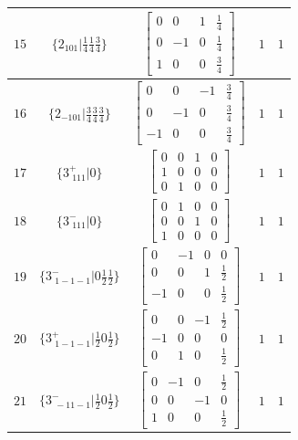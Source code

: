 \documentclass[fleqn,8pt]{jsarticle}
\begin{document}
\begin{longtable}{ccccc}
$ 15 $ & $ \{2{}_{101}|\frac{1}{4} \frac{1}{4} \frac{3}{4}\} $ & $ \begin{bmatrix} 0 & 0 & 1 & \frac{1}{4} \\ 0 & -1 & 0 & \frac{1}{4} \\ 1 & 0 & 0 & \frac{3}{4} \end{bmatrix} $ & $ 1 $ & $ 1 $ \\ \hline
$ 16 $ & $ \{2{}_{-101}|\frac{3}{4} \frac{3}{4} \frac{3}{4}\} $ & $ \begin{bmatrix} 0 & 0 & -1 & \frac{3}{4} \\ 0 & -1 & 0 & \frac{3}{4} \\ -1 & 0 & 0 & \frac{3}{4} \end{bmatrix} $ & $ 1 $ & $ 1 $ \\ \hline
$ 17 $ & $ \{3^{+}_{\,\,111}|0\} $ & $ \begin{bmatrix} 0 & 0 & 1 & 0 \\ 1 & 0 & 0 & 0 \\ 0 & 1 & 0 & 0 \end{bmatrix} $ & $ 1 $ & $ 1 $ \\ \hline
$ 18 $ & $ \{3^{-}_{\,\,111}|0\} $ & $ \begin{bmatrix} 0 & 1 & 0 & 0 \\ 0 & 0 & 1 & 0 \\ 1 & 0 & 0 & 0 \end{bmatrix} $ & $ 1 $ & $ 1 $ \\ \hline
$ 19 $ & $ \{3^{-}_{\,\,1-1-1}|0 \frac{1}{2} \frac{1}{2}\} $ & $ \begin{bmatrix} 0 & -1 & 0 & 0 \\ 0 & 0 & 1 & \frac{1}{2} \\ -1 & 0 & 0 & \frac{1}{2} \end{bmatrix} $ & $ 1 $ & $ 1 $ \\ \hline
$ 20 $ & $ \{3^{+}_{\,\,1-1-1}|\frac{1}{2} 0 \frac{1}{2}\} $ & $ \begin{bmatrix} 0 & 0 & -1 & \frac{1}{2} \\ -1 & 0 & 0 & 0 \\ 0 & 1 & 0 & \frac{1}{2} \end{bmatrix} $ & $ 1 $ & $ 1 $ \\ \hline
$ 21 $ & $ \{3^{-}_{\,\,-11-1}|\frac{1}{2} 0 \frac{1}{2}\} $ & $ \begin{bmatrix} 0 & -1 & 0 & \frac{1}{2} \\ 0 & 0 & -1 & 0 \\ 1 & 0 & 0 & \frac{1}{2} \end{bmatrix} $ & $ 1 $ & $ 1 $ \\ \hline

\end{longtable}
\end{document}
